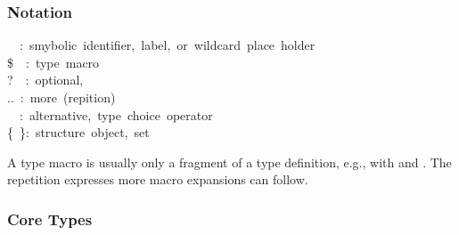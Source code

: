 \documentclass{article}
\begin{document}
\subsubsection{Notation}\label{sec3-notation}%
\begin{mdpre}%
\noindent@~~:~smybolic~identifier,~label,~or~wildcard~place~holder\\
\$~~:~type~macro\\
?~~:~optional,~\\
..~:~more~(repition)\\
\textbar{}~~:~alternative,~type~choice~operator\\
\{~\}:~structure~object,~set%
\end{mdpre}\noindent{}A type macro is usually only a fragment of a type definition, e.g.,  with  and . The repetition  expresses more macro expansions  can follow.

\subsubsection{Core Types}\label{sec3-core-types}%
\end{document}
